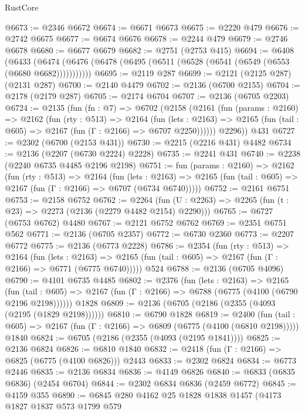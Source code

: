 \begin{lexlean}{RustCore}
\begin{coremodule}
@6673 := @2346 @6672
@6674 := @6671 @6673
@6675 := @2220 @479
@6676 := @2742 @6675
@6677 := @6674 @6676
@6678 := @2244 @479
@6679 := @2746 @6678
@6680 := @6677 @6679
@6682 := @2751 (@2753 @415)
@6694 := @6408
    (@6433 (@6474 (@6476 (@6478 (@6495 (@6511 (@6528 (@6541 (@6549 (@6553 (@6680 @6682)))))))))))
@6695 := @2119 @287
@6699 := @2121 (@2125 @287) (@2131 @287)
@6700 := @2140 @4479
@6702 := @2136 (@6700 @2155)
@6704 := @2178 (@2179 @287)
@6705 := @2174 @6704
@6707 := @2136 (@6705 @2203)
@6724 := @2135
    (fun (fn : @7) =>
    @6702
      (@2158
        (@2161
          (fun (params : @2160) =>
          @2162
            (fun (rty : @513) =>
            @2164
              (fun (lets : @2163) =>
              @2165 (fun (tail : @605) => @2167 (fun (Γ : @2166) => @6707 @2250))))))
        @2296))
    @431
@6727 := @2302 (@6700 (@2153 @431))
@6730 := @2215 (@2216 @431) @4482
@6734 := @2136 (@2207 (@6730 @2224) @2228)
@6735 := @2241 @431
@6740 := @2238 (@2240 @6735 @4485 @2196 @2198)
@6751 := fun (params : @2160) =>
  @2162
    (fun (rty : @513) =>
    @2164
      (fun (lets : @2163) =>
      @2165 (fun (tail : @605) => @2167 (fun (Γ : @2166) => @6707 (@6734 @6740)))))
@6752 := @2161 @6751
@6753 := @2158 @6752
@6762 := @2264 (fun (U : @2263) => @2265 (fun (t : @23) => @2273 (@2136 (@2279 @4482 @2154) @2290)))
@6765 := @6727 (@6753 @6762) @4480
@6767 := @2121 @6752 @6762
@6769 := @2351 @6751 @562
@6771 := @2136 (@6705 @2357)
@6772 := @6730 @2360
@6773 := @2207 @6772
@6775 := @2136 (@6773 @2228)
@6786 := @2354
    (fun (rty : @513) =>
    @2164
      (fun (lets : @2163) =>
      @2165 (fun (tail : @605) => @2167 (fun (Γ : @2166) => @6771 (@6775 @6740)))))
    @524
@6788 := @2136 (@6705 @4096)
@6790 := @4101 @6735 @4485
@6802 := @2376
    (fun (lets : @2163) =>
    @2165
      (fun (tail : @605) => @2167 (fun (Γ : @2166) => @6788 (@6775 (@4100 (@6790 @2196 @2198))))))
    @1828
@6809 := @2136 (@6705 (@2186 (@2355 (@4093 (@2195 (@1829 @2198))))))
@6810 := @6790 @1828
@6819 := @2400
    (fun (tail : @605) => @2167 (fun (Γ : @2166) => @6809 (@6775 (@4100 (@6810 @2198)))))
    @1840
@6824 := @6705 (@2186 (@2355 (@4093 (@2195 @1841))))
@6825 := @2136 @6824
@6826 := @6810 @1840
@6832 := @2418 (fun (Γ : @2166) => @6825 (@6775 (@4100 @6826))) @2443
@6833 := @2302 @6824
@6834 := @6773 @2446
@6835 := @2136 @6834
@6836 := @4149 @6826
@6840 := @6833 (@6835 @6836) (@2454 @6704)
@6844 := @2302 @6834 @6836 (@2459 @6772)
@6845 := @4159 @355
@6890 := @6845
    @280
    @4162
    @25
    @1828
    @1838
    @1457
    (@4173
      @1827
      @1837
      @573
      @1799
      @579

\end{coremodule}
\end{lexlean}
